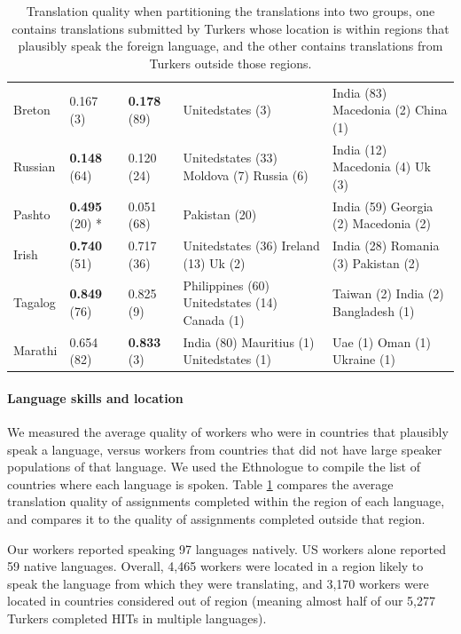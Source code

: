 \documentclass[11pt]{article}
\begin{document}
\begin{table}
\begin{center}
\begin{tabular}{lllll}
Breton & 0.167 (3) & \textbf{0.178} (89) & Unitedstates (3)  & India (83) Macedonia (2) China (1) \\
Russian & \textbf{0.148} (64) & 0.120 (24) & Unitedstates (33) Moldova (7) Russia (6)  & India (12) Macedonia (4) Uk (3)  \\
Pashto & \textbf{0.495} (20) * & 0.051 (68) & Pakistan (20)  & India (59) Georgia (2) Macedonia (2)  \\
Irish & \textbf{0.740} (51) & 0.717 (36) & Unitedstates (36) Ireland (13) Uk (2)  & India (28) Romania (3) Pakistan (2)  \\
Tagalog & \textbf{0.849} (76) & 0.825 (9) & Philippines (60) Unitedstates (14) Canada (1)  & Taiwan (2) India (2) Bangladesh (1)  \\
Marathi & 0.654 (82) & \textbf{0.833} (3) & India (80) Mauritius (1) Unitedstates (1)  & Uae (1) Oman (1) Ukraine (1) \\

\hline\hline
\end{tabular}
\normalsize
\end{center}
\caption{Translation quality when partitioning the translations into two groups, one contains translations submitted by Turkers whose location is within regions that plausibly speak the foreign language, and the other contains translations from Turkers outside those regions.} \label{region-summary}
\end{table}

\paragraph{Language skills and location}

We measured the average quality of workers who were in countries that plausibly speak a language, versus workers from countries that did not have large speaker populations of that language.  We used the Ethnologue \cite{ethnologue} to compile the list of countries where each language is spoken.  Table \ref{region-summary} compares the average translation quality of assignments completed within the region of each language, and compares it to the quality of assignments completed outside that region. 

Our workers reported speaking 97 languages natively. US workers alone reported 59 native languages. Overall, 4,465 workers were located in a region likely to speak the language from which they were translating, and 3,170 workers were located in countries considered out of region (meaning almost half of our 5,277 Turkers completed HITs in multiple languages). 
\end{document}
